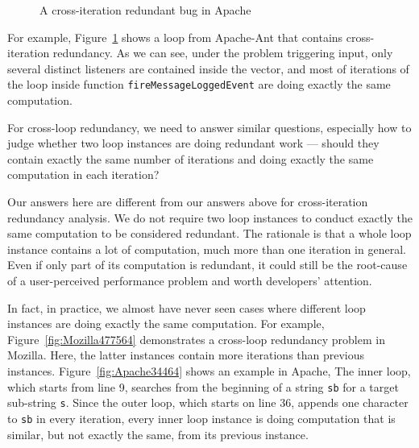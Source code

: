 \begin{figure}
\caption{A cross-iteration redundant bug in Apache}
\label{fig:Apache37184}
\end{figure}



For example, Figure~\ref{fig:Apache37184} shows a loop from Apache-Ant that
contains cross-iteration redundancy.
As we can see, under the problem triggering input, 
only several distinct listeners are contained inside the vector, and most of 
iterations of the loop inside function \texttt{fireMessageLoggedEvent}
are doing exactly the same computation. 





For cross-loop redundancy, we need to answer similar questions,
especially how to judge whether two loop instances are doing redundant work ---
should they contain exactly the same number of iterations and doing exactly
the same computation in each iteration?

Our answers here are different from our answers above for cross-iteration
redundancy analysis.
We do not require two loop instances to
conduct exactly the same computation to be considered redundant. The rationale
is that a whole loop instance contains a lot of computation, much more than
one iteration in general. Even if only part of its computation
is redundant, it could still be the root-cause of a user-perceived performance
problem and worth developers' attention. 

In fact, in practice, we almost have never seen cases where different loop 
instances are doing exactly the same computation.
For example, Figure~\ref{fig:Mozilla477564} demonstrates a cross-loop redundancy
problem in Mozilla. Here, the
latter instances contain more iterations than previous instances. 
Figure~\ref{fig:Apache34464} shows an example in Apache, 
The inner loop, which starts from line 9,  
searches from the beginning of a string \texttt{sb} for a target sub-string 
\texttt{s}. Since the outer loop, which starts on line 36, appends one 
character to \texttt{sb} in every iteration, every inner loop instance is 
doing computation that is similar, but not exactly the same, 
from its previous instance.


